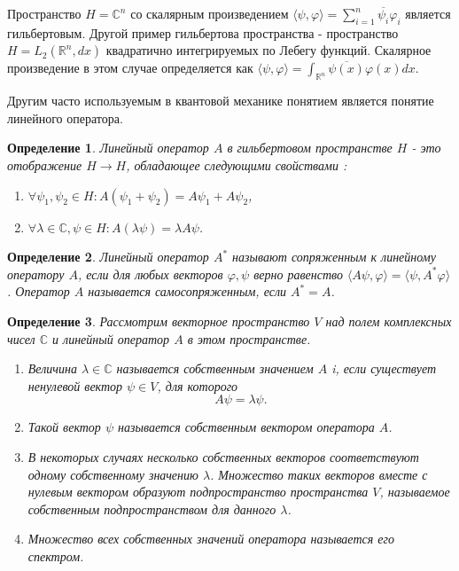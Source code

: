 \documentclass[11pt]{article}
\newtheorem{definition}{Определение}[section]
\begin{document}
Пространство $H = \mathbb{C}^n$ со скалярным произведением $\langle\psi, \varphi \rangle = \sum_{i = 1}^n \overline{\psi_i}\varphi_i$ является гильбертовым. Другой пример гильбертова пространства - пространство $H = L_2(\mathbb{R}^n, dx)$ квадратично интегрируемых по Лебегу функций. Скалярное произведение в этом случае определяется как $\langle\psi, \varphi \rangle = \int_{\mathbb{R}^n}\overline{\psi(x)}\varphi(x) dx$.

Другим часто используемым в квантовой механике понятием является понятие линейного оператора.
\begin{definition}
Линейный оператор $A$ в гильбертовом пространстве $H$ - это отображение $H \to H$, обладающее следующими свойствами :
\begin{enumerate}
\item $\forall \psi_1,\psi_2\in H: A(\psi_1 + \psi_2) = A\psi_1 + A\psi_2 $,
\item $\forall\lambda\in\mathbb{C}, \psi\in H: A(\lambda\psi) = \lambda A\psi$.
\end{enumerate}
\end{definition}

\begin{definition}
Линейный оператор $A^*$ называют сопряженным к линейному оператору $A$, если для любых векторов $\varphi, \psi$ верно равенство $\langle A\psi,\varphi\rangle = \langle\psi, A^*\varphi\rangle$. Оператор $A$ называется самосопряженным, если $A^* = A$.
\end{definition}

\begin{definition}
Рассмотрим векторное пространство $V$ над полем комплексных чисел $\mathbb{C}$ и линейный оператор $A$ в этом пространстве.
\begin{enumerate}
\item Величина $\lambda\in \mathbb{C}$ называется собственным значением $A$ i, если существует ненулевой вектор $\psi\in V$, для которого
\[
A\psi = \lambda\psi.
\]
\item Такой вектор $\psi$ называется собственным вектором оператора $A$.
\item В некоторых случаях несколько собственных векторов соответствуют одному собственному значению $\lambda$. Множество таких векторов вместе с нулевым вектором образуют подпространство пространства $V$, называемое собственным подпространством для данного $\lambda$.
\item Множество всех собственных значений оператора называется его спектром.
\end{enumerate}
\end{definition}
\end{document}
